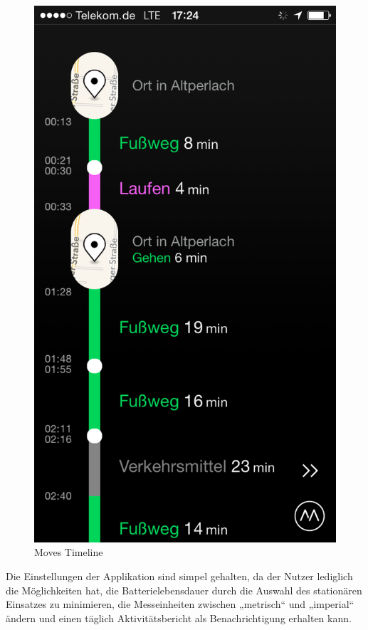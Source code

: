 \begin{figure}[H]
 \centering
 \includegraphics[scale=0.3]{images/moves_app_screenshot.png}
 \caption{Moves Timeline \cite{fig:Timeline}}
 \label{fig:Timeline}
\end{figure}

Die Einstellungen der Applikation sind simpel gehalten, da der Nutzer lediglich die Möglichkeiten hat, die Batterielebensdauer durch die Auswahl des stationären Einsatzes zu minimieren, die Messeinheiten zwischen „metrisch“ und „imperial“ ändern und einen täglich Aktivitätsbericht als Benachrichtigung erhalten kann. 


